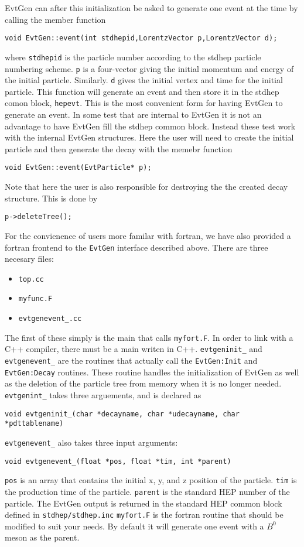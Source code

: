 EvtGen can after this initialization be asked to generate one
event at the time by calling the member function
\begin{verbatim}
void EvtGen::event(int stdhepid,LorentzVector p,LorentzVector d);
\end{verbatim}
where {\tt stdhepid} is the particle number according to the stdhep
particle numbering scheme. {\tt p} is a four-vector giving the 
initial momentum and energy of the initial particle. Similarly.
{\tt d} gives the initial vertex and time for the initial particle.
This function will generate an event and then store it in the
stdhep comon block, {\tt hepevt}. This is the most convenient 
form for having EvtGen to generate an event. In some test that
are internal to EvtGen it is not an advantage to have EvtGen
fill the stdhep common block. Instead these test work with
the internal EvtGen structures. Here the user will need to create the
initial particle and then generate the decay with the
memebr function
\begin{verbatim}
void EvtGen::event(EvtParticle* p);
\end{verbatim}
Note that here the user is also responsible for destroying the 
the created decay structure. This is done by
\begin{verbatim}
p->deleteTree();
\end{verbatim}

For the convienence of users more familar with fortran, we
have also provided a fortran frontend to the {\tt EvtGen} 
interface described above.  There are three necesary files:
\begin{itemize}
\item {\tt top.cc}
\item {\tt myfunc.F}
\item {\tt evtgenevent\_.cc}
\end{itemize}

The first of these simply is the main that calls 
{\tt myfort.F}.  In order to link with a C++ compiler,
there must be a main writen in C++.  {\tt evtgeninit\_}
and {\tt evtgenevent\_}
are the routines that actually call the {\tt EvtGen:Init}
and {\tt EvtGen:Decay} routines.  These routine handles
the initialization of EvtGen as well as
the deletion of the particle tree from memory when it
is no longer needed.  {\tt evtgenint\_} takes three 
arguements, and is declared as
\begin{verbatim}
void evtgeninit_(char *decayname, char *udecayname, char *pdttablename)
\end{verbatim}
{\tt evtgenevent\_} also takes three
input arguments:
\begin{verbatim}
void evtgenevent_(float *pos, float *tim, int *parent) 
\end{verbatim}
{\tt pos} is an array that contains the initial x, y, and
z position of the particle.  {\tt tim} is the production
time of the particle.  {\tt parent} is the standard HEP
number of the particle.  The EvtGen output is returned
in the standard HEP common block defined in {\tt stdhep/stdhep.inc}
{\tt myfort.F} is the fortran
routine that should be modified to suit your needs.  By
default it will generate one event with a $B^0$ meson
as the parent.  

